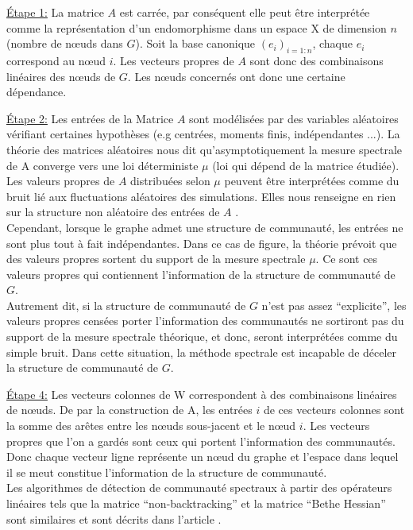 \par{\underline{Étape 1:}}
La matrice $A$ est carrée, par conséquent elle peut être interprétée comme la représentation d'un endomorphisme dans un espace X de dimension $n$ (nombre de nœuds dans $G$).
Soit la base canonique $(e_i)_{i=1:n}$, chaque $e_i$ correspond au nœud $i$.
Les vecteurs propres de $A$ sont donc des combinaisons linéaires des nœuds de $G$.
Les nœuds concernés ont donc une certaine dépendance.
\par{\underline{Étape 2:}}
Les entrées de la Matrice $A$ sont modélisées par des variables aléatoires vérifiant certaines hypothèses (e.g centrées, moments finis, indépendantes ...).
La théorie des matrices aléatoires nous dit qu’asymptotiquement la mesure spectrale de A converge vers une loi déterministe $\mu$ (loi qui dépend de la matrice étudiée).
Les valeurs propres de $A$ distribuées selon $\mu$ peuvent être interprétées comme du bruit lié aux fluctuations aléatoires des simulations.
Elles nous renseigne en rien sur la structure non aléatoire des entrées de $A$ .\\
Cependant, lorsque le graphe admet une structure de communauté, les entrées ne sont plus tout à fait indépendantes.
Dans ce cas de figure, la théorie prévoit que des valeurs propres sortent du support de la mesure spectrale $\mu$.
Ce sont ces valeurs propres qui contiennent l'information de la structure de communauté de $G$.\\
Autrement dit, si la structure de communauté de $G$ n'est pas assez ``explicite'', les valeurs propres censées porter l'information des communautés ne sortiront pas du support de la mesure spectrale théorique, et donc, seront interprétées comme du simple bruit.
Dans cette situation, la méthode spectrale est incapable de déceler la structure de communauté de $G$.
\par{\underline{Étape 4:}}
Les vecteurs colonnes de W correspondent à des combinaisons linéaires de nœuds.
De par la construction de A, les entrées $i$ de ces vecteurs colonnes sont la somme des arêtes entre les nœuds sous-jacent et le nœud $i$.
Les vecteurs propres que l'on a gardés sont ceux qui portent l'information des communautés.
Donc chaque vecteur ligne représente un nœud du graphe et l'espace dans lequel il se meut constitue l'information de la structure de communauté.\\

Les algorithmes de détection de communauté spectraux à partir des opérateurs linéaires tels que la matrice ``non-backtracking'' et la matrice ``Bethe Hessian'' sont similaires et sont décrits dans l'article \cite[Spectral detection in the censored block model]{Spectral_Detection_in_the_Censored_Block_Model}.
